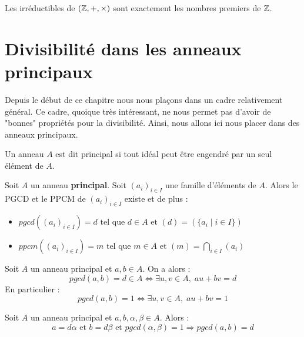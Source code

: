 \begin{example}
    Les irréductibles de $(\mathbb{Z}, +, \times)$ sont exactement les nombres premiers de $\mathbb{Z}$. 
\end{example}



\section{Divisibilité dans les anneaux principaux}

Depuis le début de ce chapitre nous nous plaçons dans un cadre relativement général. 
Ce cadre, quoique très intéressant, ne nous permet pas d'avoir de "bonnes" propriétés pour la divisibilité. 
Ainsi, nous allons ici nous placer dans des anneaux principaux. 

\begin{remark}[Rappel]
    Un anneau $A$ est dit principal si tout idéal peut être engendré par un seul élément de $A$. 
\end{remark}

\begin{theorem}
    Soit $A$ un anneau \textbf{principal}. Soit $(a_i)_{i \in I}$ une famille d'éléments de $A$. 
    Alors le PGCD et le PPCM de $(a_i)_{i \in I}$ existe et de plus : 
        \begin{itemize}
            \item $ pgcd((a_i)_{i \in I}) = d \text{ tel que } d \in A \text{ et } (d) = (\{a_i \; | \; i \in I \}) $ 
            \item $ ppcm((a_i)_{i \in I}) = m \text{ tel que } m \in A \text{ et } (m) = \bigcap_{i \in I} (a_i) $
        \end{itemize}
\end{theorem}

\begin{theorem}[Bézout]
    Soit $A$ un anneau principal et $a,b \in A$. On a alors : 
        \[ \boxed{ pgcd(a,b) = d \in A \iff \exists u, v \in A, \; au + bv = d } \] 
    En particulier : 
        \[ pgcd(a,b) = 1 \iff \exists u, v \in A, \; au + bv = 1 \] 
\end{theorem}

\begin{corollary}[Bézout]
    Soit $A$ un anneau principal et $a,b, \alpha, \beta \in A$. Alors : 
        \[ a = d \alpha \text{ et } b = d \beta \text{ et } pgcd(\alpha, \beta) = 1 \Longrightarrow pgcd(a,b) = d \] 
\end{corollary}

